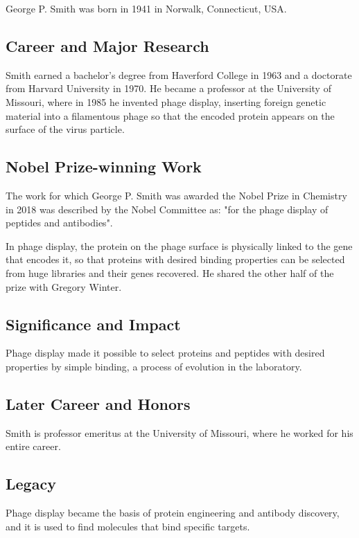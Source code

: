 George P. Smith was born in 1941 in Norwalk, Connecticut, USA.

\subsection*{Career and Major Research}

Smith earned a bachelor's degree from Haverford College in 1963 and a doctorate from Harvard University in 1970. He became a professor at the University of Missouri, where in 1985 he invented phage display, inserting foreign genetic material into a filamentous phage so that the encoded protein appears on the surface of the virus particle.

\subsection*{Nobel Prize-winning Work}

The work for which George P. Smith was awarded the Nobel Prize in Chemistry in 2018 was described by the Nobel Committee as: "for the phage display of peptides and antibodies".

In phage display, the protein on the phage surface is physically linked to the gene that encodes it, so that proteins with desired binding properties can be selected from huge libraries and their genes recovered. He shared the other half of the prize with Gregory Winter.

\subsection*{Significance and Impact}

Phage display made it possible to select proteins and peptides with desired properties by simple binding, a process of evolution in the laboratory.

\subsection*{Later Career and Honors}

Smith is professor emeritus at the University of Missouri, where he worked for his entire career.

\subsection*{Legacy}

Phage display became the basis of protein engineering and antibody discovery, and it is used to find molecules that bind specific targets.

